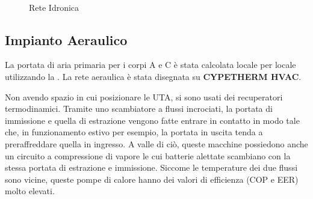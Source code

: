\begin{figure}
	\centering
	\\
	\caption{Rete Idronica}\label{idr}
\end{figure}

\subsection{Impianto Aeraulico}
La portata di aria primaria per i corpi A e C è stata calcolata locale per locale utilizzando la \norvent. La rete aeraulica è stata disegnata su \textbf{CYPETHERM HVAC}. 

Non avendo spazio in cui posizionare le UTA, si sono usati dei recuperatori termodinamici. Tramite uno scambiatore a flussi incrociati, la portata di immissione e quella di estrazione vengono fatte entrare in contatto in modo tale che, in funzionamento estivo per esempio, la portata in uscita tenda a preraffreddare quella in ingresso. A valle di ciò, queste macchine possiedono anche un circuito a compressione di vapore le cui batterie alettate scambiano con la stessa portata di estrazione e immissione. Siccome le temperature dei due flussi sono vicine, queste pompe di calore hanno dei valori di efficienza (COP e EER) molto elevati.

